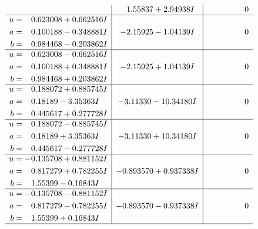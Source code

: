 \documentclass[1p]{elsarticle_modified}
\theoremstyle{definition}
\begin{document}
$$\begin{array}{c|c|c}
 & \phantom{-}1.55837 + 2.94938 I & \phantom{-0.000000 } 0 \\ \hline\begin{aligned}
u &= \phantom{-}0.623008 + 0.662516 I \\
a &= \phantom{-}0.100188 - 0.348881 I \\
b &= \phantom{-}0.984468 - 0.203862 I\end{aligned}
 & -2.15925 - 1.04139 I & \phantom{-0.000000 } 0 \\ \hline\begin{aligned}
u &= \phantom{-}0.623008 - 0.662516 I \\
a &= \phantom{-}0.100188 + 0.348881 I \\
b &= \phantom{-}0.984468 + 0.203862 I\end{aligned}
 & -2.15925 + 1.04139 I & \phantom{-0.000000 } 0 \\ \hline\begin{aligned}
u &= \phantom{-}0.188072 + 0.885745 I \\
a &= \phantom{-}0.18189 - 3.35363 I \\
b &= \phantom{-}0.445617 + 0.277728 I\end{aligned}
 & -3.11330 - 10.34180 I & \phantom{-0.000000 } 0 \\ \hline\begin{aligned}
u &= \phantom{-}0.188072 - 0.885745 I \\
a &= \phantom{-}0.18189 + 3.35363 I \\
b &= \phantom{-}0.445617 - 0.277728 I\end{aligned}
 & -3.11330 + 10.34180 I & \phantom{-0.000000 } 0 \\ \hline\begin{aligned}
u &= -0.135708 + 0.881152 I \\
a &= \phantom{-}0.817279 + 0.782255 I \\
b &= \phantom{-}1.55399 - 0.16843 I\end{aligned}
 & -0.893570 + 0.937338 I & \phantom{-0.000000 } 0 \\ \hline\begin{aligned}
u &= -0.135708 - 0.881152 I \\
a &= \phantom{-}0.817279 - 0.782255 I \\
b &= \phantom{-}1.55399 + 0.16843 I\end{aligned}
 & -0.893570 - 0.937338 I & \phantom{-0.000000 } 0\\
 \hline 
 \end{array}$$\newpage$$\begin{array}{c|c|c}  

\end{array}$$
\end{document}
